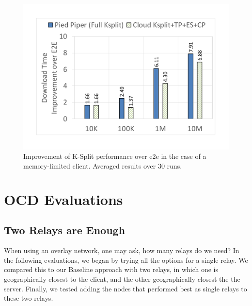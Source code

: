 \documentclass[newfonts=false,format=sigconf,10pt,letterpaper]{acmart}
\newcommand{\ksplit}{K-Split\xspace}
\begin{document}
\begin{figure}
  \centering
    \includegraphics[width=\columnwidth,trim=20mm 25mm 25mm 25mm,clip]{figures/WeakClient-Improvement.pdf}
    \caption{Improvement of \ksplit performance over e2e in the case of a memory-limited client. Averaged results over 30 runs.} 
    \label{fig:ksplit-weak-client}
\end{figure}

\section{OCD Evaluations%
}\label{sec:baseline-good_enough}

\subsection{Two Relays are Enough}\label{subsec:num_of_relays}
When using an overlay network, one may ask, how many relays do we need? In the following evaluations, we began by trying all the options for a single relay. We compared this to our Baseline approach with two relays, in which one is geographically-closest to the client, and the other geographically-closest the the server. Finally, we  tested adding the nodes that performed best as single relays to these two relays.
\end{document}

